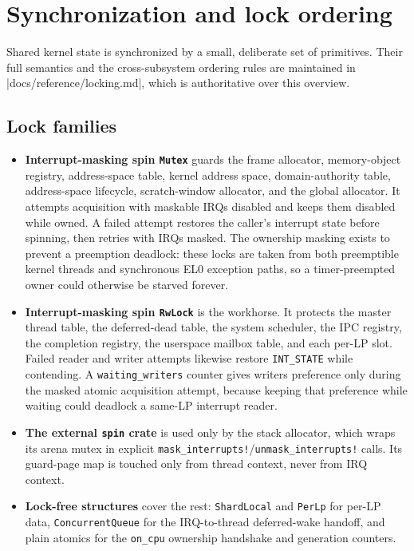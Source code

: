 \section{Synchronization and lock ordering}

Shared kernel state is synchronized by a small, deliberate set of primitives.
Their full semantics and the cross-subsystem ordering rules are maintained in
\repofile|docs/reference/locking.md|, which is authoritative over this
overview.

\subsection{Lock families}

\begin{itemize}
    \item \textbf{Interrupt-masking spin \texttt{Mutex}} guards the frame
        allocator, memory-object registry, address-space table, kernel address
        space, domain-authority table, address-space lifecycle, scratch-window
        allocator, and the global allocator. It attempts acquisition with
        maskable IRQs disabled and keeps them disabled while owned. A failed
        attempt restores the caller's interrupt state before spinning, then
        retries with IRQs masked. The ownership masking exists to prevent a
        preemption deadlock: these locks are taken from both preemptible kernel
        threads and synchronous EL0 exception paths, so a timer-preempted owner
        could otherwise be starved forever.

    \item \textbf{Interrupt-masking spin \texttt{RwLock}} is the workhorse. It
        protects the master thread table, the deferred-dead table, the system
        scheduler, the IPC registry, the completion registry, the userspace
        mailbox table, and each per-LP slot. Failed reader and writer attempts
        likewise restore \texttt{INT\_STATE} while contending. A
        \texttt{waiting\_writers} counter gives writers preference only during
        the masked atomic acquisition attempt, because keeping that preference while
        waiting could deadlock a same-LP interrupt reader.

    \item \textbf{The external \texttt{spin} crate} is used only by the stack
        allocator, which wraps its arena mutex in explicit
        \texttt{mask\_interrupts!}/\texttt{unmask\_interrupts!} calls. Its
        guard-page map is touched only from thread context, never from IRQ
        context.

    \item \textbf{Lock-free structures} cover the rest: \texttt{ShardLocal} and
        \texttt{PerLp} for per-LP data, \texttt{ConcurrentQueue} for the
        IRQ-to-thread deferred-wake handoff, and plain atomics for the
        \texttt{on\_cpu} ownership handshake and generation counters.
\end{itemize}

